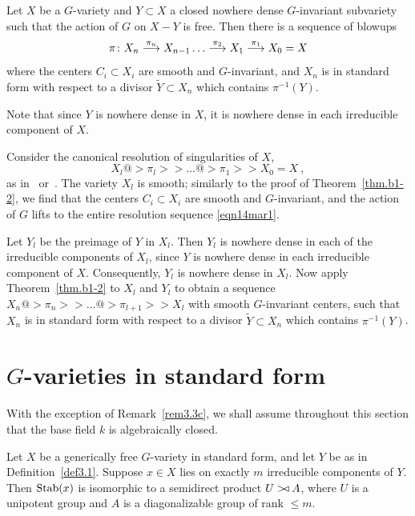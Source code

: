 \begin{cor} \label{cor.b1-1}
Let $X$ be a $G$-variety and $Y\subset X$ a closed nowhere dense $G$-invariant
subvariety such that the action of $G$ on $X-Y$ is free. Then
there is a sequence of blowups
\begin{equation}  \label{eqn.cor.b1-1}
\pi\colon X_n \stackrel{\pi_n}{\longrightarrow} X_{n-1}
\dots \stackrel{\pi_2}{\longrightarrow} X_1 \stackrel{\pi_1}{\longrightarrow} X_0 = X
\end{equation}
where the centers $C_i\subset X_{i}$ are smooth and $G$-invariant, and $X_n$
is in standard form with respect to a divisor $\tilde Y\subset X_n$
which contains $\pi^{-1}(Y)$.
\end{cor}

\begin{pf}
Note that since $Y$ is nowhere dense in $X$, it is nowhere dense in each
irreducible component of $X$.

Consider the canonical resolution of singularities of $X$,
\begin{equation} \label{eqn14mar1}
X_l@>\pi_l>>\dots @>\pi_1>>X_0=X\ ,
\end{equation}
as in~\cite[Theorem~7.6.1]{Vil2} or~\cite[Theorem~13.2]{bm}.
The variety $X_l$ is smooth; similarly to the proof of Theorem~\ref{thm.b1-2},
we find that the centers $C_i\subset X_{i}$ are smooth 
and $G$-invariant, and the action of $G$ lifts to the entire resolution 
sequence \eqref{eqn14mar1}.

Let  $Y_l$ be the preimage of $Y$ in $X_l$. Then  $Y_l$ is nowhere dense in
each of the irreducible components of $X_l$, since $Y$ is nowhere dense in each
irreducible component of $X$. Consequently, $Y_l$ is nowhere dense in $X_l$.
Now apply Theorem~\ref{thm.b1-2} to $X_l$ and $Y_l$
to obtain a sequence
$X_n@>\pi_n>>\dots @>\pi_{l+1}>>X_l$
with smooth $G$-invariant centers, such that $X_n$ is in standard form
with respect to a divisor $\tilde Y\subset X_n$
which contains $\pi^{-1}(Y)$.
\end{pf}


\section{$G$-varieties in standard form}
\label{sect4}

With the exception of Remark~\ref{rem3.3c}, we shall assume 
throughout this section that the base field $k$ is algebraically closed.

\begin{thm} \label{thm3.2}
Let $X$ be a generically free $G$-variety in standard form,
and let $Y$ be as in Definition~\ref{def3.1}.
Suppose $x \in X$ lies on exactly $m$ irreducible components of $Y$. 
Then $\operatorname{Stab}(x)$ is isomorphic to a semidirect product $U \mathbin{{>}\!{\triangleleft}} A$, 
where $U$ is a unipotent group and $A$ is a diagonalizable
group of rank $\leq m$. 
\end{thm}

